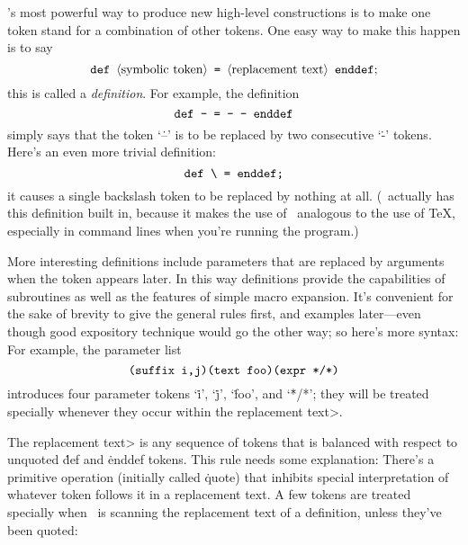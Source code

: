 \MF's most powerful way to produce new high-level constructions is to make
one token stand for a combination of other tokens. One easy way to
make this happen is to say
$$\hbox{\.{def} \<symbolic token> \.=
  \<replacement text> \.{enddef};}$$
this is called a {\it definition}.  For example, the definition
$$\hbox{\tt def -- = - - enddef}$$
simply says that the token `\.{--}' is to be replaced by two
consecutive `\.-' tokens. Here's an even more trivial definition:
$$\hbox{\tt def \char`\\\ = enddef;}$$
it causes a single backslash token to be replaced by nothing at all.
(\MF\ actually has this definition built in, because it makes
the use of \MF\ analogous to the use of \TeX, especially in command
lines when you're running the program.)

More interesting definitions include parameters that are replaced by
arguments when the token appears later. In this way definitions provide
the capabilities of subroutines as well as the features of simple macro
expansion.  It's convenient for the sake of brevity to give the general
rules first, and examples later---even though good expository technique
would go the other way; so here's more syntax:
For example, the parameter list
$$\hbox{\tt (suffix i,j)(text foo)(expr */*)}$$
introduces four parameter
tokens `\.i', `\.j', `\.{foo}', and `\.{*/*}'; they will be
treated specially whenever they occur within the \<replacement
text>.

The \<replacement text> is any sequence of tokens that is balanced with
respect to unquoted \.{def} and \.{enddef} tokens.
This rule needs some explanation:
There's a primitive operation (initially called \.{quote}) that
inhibits special interpretation of whatever token follows it in a
replacement text. A few
tokens are treated specially when \MF\ is scanning the replacement text of
a definition, unless they've been quoted:

